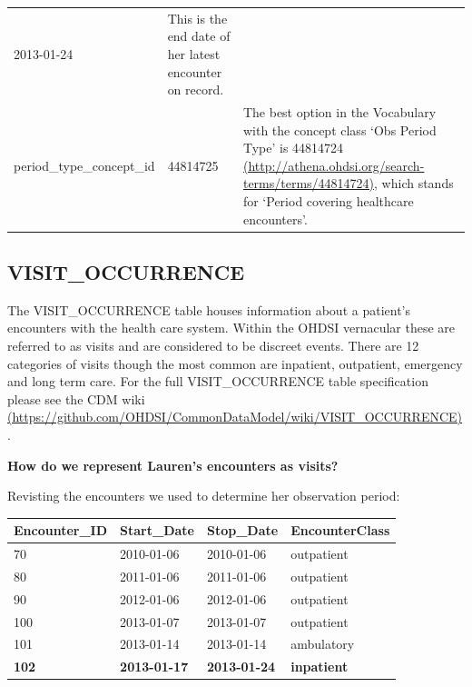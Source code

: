 \documentclass[]{book}
\begin{document}
\begin{longtable}[]{@{}lll@{}}
\begin{minipage}[t]{0.15\columnwidth}
2013-01-24\strut
\end{minipage} & \begin{minipage}[t]{0.43\columnwidth}\raggedright
This is the end date of her latest encounter on record.\strut
\end{minipage}\tabularnewline
\begin{minipage}[t]{0.33\columnwidth}\raggedright
period\_type\_concept\_id\strut
\end{minipage} & \begin{minipage}[t]{0.15\columnwidth}\raggedright
44814725\strut
\end{minipage} & \begin{minipage}[t]{0.43\columnwidth}\raggedright
The best option in the Vocabulary with the concept class `Obs Period Type' is 44814724 \href{http://athena.ohdsi.org/search-terms/terms/44814724}{(http://athena.ohdsi.org/search-terms/terms/44814724)}, which stands for `Period covering healthcare encounters'.\strut
\end{minipage}\tabularnewline
\bottomrule
\end{longtable}

\hypertarget{visitOccurrence}{%
\subsection{VISIT\_OCCURRENCE}\label{visitOccurrence}}

The VISIT\_OCCURRENCE table houses information about a patient's encounters with the health care system. Within the OHDSI vernacular these are referred to as visits and are considered to be discreet events. There are 12 categories of visits though the most common are inpatient, outpatient, emergency and long term care. For the full VISIT\_OCCURRENCE table specification please see the CDM wiki \href{https://github.com/OHDSI/CommonDataModel/wiki/VISIT_OCCURRENCE}{(https://github.com/OHDSI/CommonDataModel/wiki/VISIT\_OCCURRENCE)}.

\textbf{How do we represent Lauren's encounters as visits?}

Revisting the encounters we used to determine her observation period:

\begin{longtable}[]{@{}llll@{}}
\toprule
Encounter\_ID & Start\_Date & Stop\_Date & EncounterClass\tabularnewline
\midrule
\endhead
70 & 2010-01-06 & 2010-01-06 & outpatient\tabularnewline
80 & 2011-01-06 & 2011-01-06 & outpatient\tabularnewline
90 & 2012-01-06 & 2012-01-06 & outpatient\tabularnewline
100 & 2013-01-07 & 2013-01-07 & outpatient\tabularnewline
101 & 2013-01-14 & 2013-01-14 & ambulatory\tabularnewline
\textbf{102} & \textbf{2013-01-17} & \textbf{2013-01-24} & \textbf{inpatient}\tabularnewline
\bottomrule
\end{longtable}
\end{document}
